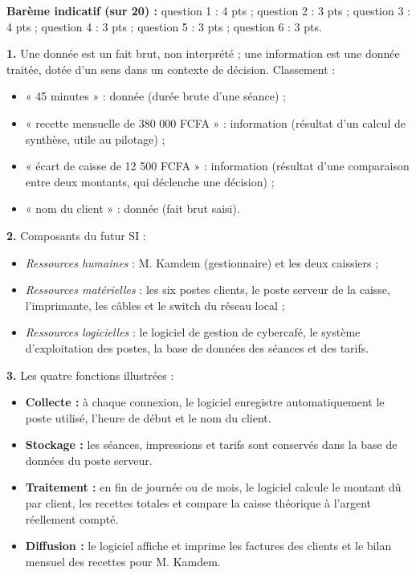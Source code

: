 \documentclass[11pt]{article}
\newcommand{\cle}[1]{{\popxbold\color{popdark}#1}}
\begin{document}
\begin{corrige}
\textbf{Barème indicatif (sur 20) :} question 1 : 4 pts ; question 2 : 3 pts ; question 3 : 4 pts ; question 4 : 3 pts ; question 5 : 3 pts ; question 6 : 3 pts.

\textbf{1.} Une \cle{donnée} est un fait brut, non interprété ; une \cle{information} est une donnée traitée, dotée d'un sens dans un contexte de décision. Classement :
\begin{itemize}
\item « 45 minutes » : \cle{donnée} (durée brute d'une séance) ;
\item « recette mensuelle de 380 000 FCFA » : \cle{information} (résultat d'un calcul de synthèse, utile au pilotage) ;
\item « écart de caisse de 12 500 FCFA » : \cle{information} (résultat d'une comparaison entre deux montants, qui déclenche une décision) ;
\item « nom du client » : \cle{donnée} (fait brut saisi).
\end{itemize}

\textbf{2.} Composants du futur SI :
\begin{itemize}
\item \emph{Ressources humaines} : M. Kamdem (gestionnaire) et les deux caissiers ;
\item \emph{Ressources matérielles} : les six postes clients, le poste serveur de la caisse, l'imprimante, les câbles et le switch du réseau local ;
\item \emph{Ressources logicielles} : le logiciel de gestion de cybercafé, le système d'exploitation des postes, la base de données des séances et des tarifs.
\end{itemize}

\textbf{3.} Les quatre fonctions illustrées :
\begin{itemize}
\item \textbf{Collecte :} à chaque connexion, le logiciel enregistre automatiquement le poste utilisé, l'heure de début et le nom du client.
\item \textbf{Stockage :} les séances, impressions et tarifs sont conservés dans la base de données du poste serveur.
\item \textbf{Traitement :} en fin de journée ou de mois, le logiciel calcule le montant dû par client, les recettes totales et compare la caisse théorique à l'argent réellement compté.
\item \textbf{Diffusion :} le logiciel affiche et imprime les factures des clients et le bilan mensuel des recettes pour M. Kamdem.
\end{itemize}


\end{corrige}
\end{document}
